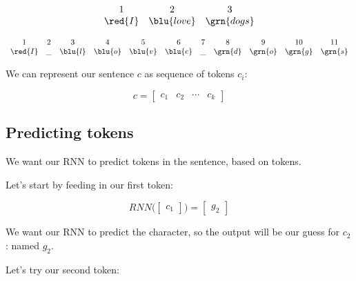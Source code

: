         \begin{equation}
            \begin{matrix}
                1&2&3\\
                \red{I}&\blu{love}&\grn{dogs}
            \end{matrix}
        \end{equation}
        
        \begin{equation}
            \begin{array}{ccccccccccc}
                1 & 2 & 3 & 4 & 5 & 6 & 7 & 8 & 9 & 10 & 11 \\
                \red{I} & \_ & \blu{l} & \blu{o} & \blu{v} & \blu{e} & \_ & \grn{d} & \grn{o} & \grn{g} & \grn{s} \\
            \end{array}
        \end{equation}

        We can represent our sentence $c$ as sequence of tokens $c_i$:

        \begin{equation}
            c = \begin{bmatrix}
                c_1 & c_2 & \cdots & c_k
            \end{bmatrix}
        \end{equation}

    \subsection{Predicting tokens}

        We want our RNN to predict  tokens in the sentence, based on  tokens.  

        Let's start by feeding in our first token:

        \begin{equation}
            RNN\Bigg(\begin{bmatrix}
                c_1
            \end{bmatrix}\Bigg)
            =
            \begin{bmatrix}
                g_2
            \end{bmatrix}
        \end{equation}

        We want our RNN to predict the  character, so the output will be our guess for $c_2$: named $g_2$.

        Let's try our second token:


